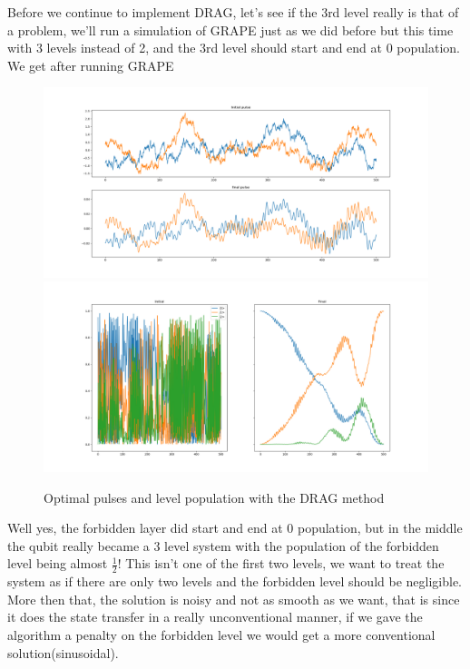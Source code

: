 \documentclass[english, a4paper, 12pt, twoside]{article}
\numberwithin{equation}{section} %
\begin{document}
Before we continue to implement DRAG, let's see if the 3rd level really is that of a problem, we'll run a simulation of GRAPE just as we did before but this time with 3 levels instead of 2, and the 3rd level should start and end at 0 population. We get after running GRAPE
\begin{figure}[H]
    \centering
    \caption{Optimal pulses and level population with the DRAG method}
    \includegraphics[width=1\columnwidth]{Results/Before-Drag/pulses.png}
    \includegraphics[width=1\columnwidth]{Results/Before-Drag/population.png}
    \label{fig:before-DRAG} %
\end{figure}
Well yes, the forbidden layer did start and end at $0$ population, but in the middle the qubit really became a 3 level system with the population of the forbidden level being almost $\frac{1}{2}$! This isn't one of the first two levels, we want to treat the system as if there are only two levels and the forbidden level should be negligible. More then that, the solution is noisy and not as smooth as we want, that is since it does the state transfer in a really unconventional manner, if we gave the algorithm a penalty on the forbidden level we would get a more conventional solution(sinusoidal).
\end{document}
